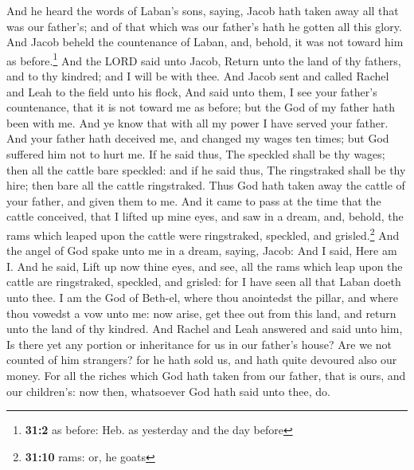  And he heard the words of Laban's sons, saying, Jacob
hath taken away all that was our father's; and of that which was our
father's hath he gotten all this glory.  And Jacob beheld
the countenance of Laban, and, behold, it was not toward him as
before.\footnote{\textbf{31:2} as before: Heb. as yesterday and the day
  before}  And the LORD said unto Jacob, Return unto the
land of thy fathers, and to thy kindred; and I will be with thee.
 And Jacob sent and called Rachel and Leah to the field
unto his flock,  And said unto them, I see your father's
countenance, that it is not toward me as before; but the God of my
father hath been with me.  And ye know that with all my
power I have served your father.  And your father hath
deceived me, and changed my wages ten times; but God suffered him not to
hurt me.  If he said thus, The speckled shall be thy
wages; then all the cattle bare speckled: and if he said thus, The
ringstraked shall be thy hire; then bare all the cattle ringstraked.
 Thus God hath taken away the cattle of your father, and
given them to me.  And it came to pass at the time that
the cattle conceived, that I lifted up mine eyes, and saw in a dream,
and, behold, the rams which leaped upon the cattle were ringstraked,
speckled, and grisled.\footnote{\textbf{31:10} rams: or, he goats}
 And the angel of God spake unto me in a dream, saying,
Jacob: And I said, Here am I.  And he said, Lift up now
thine eyes, and see, all the rams which leap upon the cattle are
ringstraked, speckled, and grisled: for I have seen all that Laban doeth
unto thee.  I am the God of Beth-el, where thou
anointedst the pillar, and where thou vowedst a vow unto me: now arise,
get thee out from this land, and return unto the land of thy kindred.
 And Rachel and Leah answered and said unto him, Is there
yet any portion or inheritance for us in our father's house?
 Are we not counted of him strangers? for he hath sold
us, and hath quite devoured also our money.  For all the
riches which God hath taken from our father, that is ours, and our
children's: now then, whatsoever God hath said unto thee, do.

